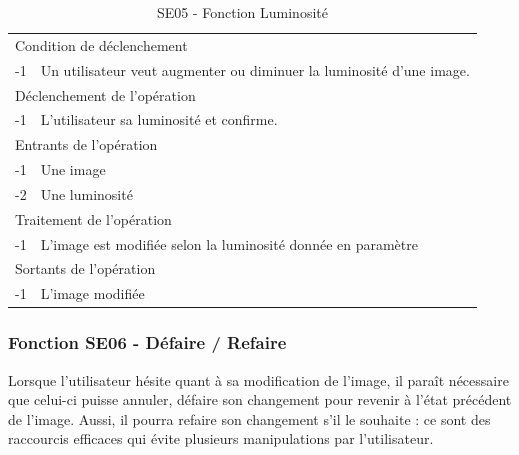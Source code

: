 \documentclass[a4paper]{article}
\begin{document}
\begin{table}[H]
  \centering
   \small
	\begin{tabular}{|c|p{12cm}|}
   		\hline
   			\rowcolor{lightgray}\multicolumn{2}{|c|}{\textbf{SE05 - Fonction Luminosité}} \\
   		\hline
   			\multicolumn{2}{|l|}{Condition de d\'eclenchement} \\
   		\hline
   			-1 & Un utilisateur veut augmenter ou diminuer la luminosité d'une image. \\
   		\hline
   			\multicolumn{2}{|l|}{D\'eclenchement de l'op\'eration} \\
   		\hline
   			-1 & L'utilisateur sa luminosité et confirme. \\
   		\hline
   			\multicolumn{2}{|l|}{Entrants de l'op\'eration} \\
   		\hline
        	-1 & Une image \\
   			-2 & Une luminosité \\ 	
        \hline
   			\multicolumn{2}{|l|}{Traitement de l'op\'eration} \\
  		\hline
   			-1 & L'image est modifiée selon la luminosité donnée en paramètre \\
   		\hline
   			\multicolumn{2}{|l|}{Sortants de l'op\'eration} \\
   		\hline
   			-1 & L'image modifiée \\
   		\hline
	\end{tabular}
  \caption{SE05 - Fonction Luminosité}
  \normalsize
  \label{tab:visu_img_luminosite}
\end{table}

\subsubsection{Fonction SE06 - Défaire / Refaire}

Lorsque l'utilisateur hésite quant à sa modification de l'image, il paraît nécessaire que celui-ci puisse annuler, défaire son changement pour revenir à l'état précédent de l'image. Aussi, il pourra refaire son changement s'il le souhaite : ce sont des raccourcis efficaces qui évite plusieurs manipulations par l'utilisateur.
\end{document}
